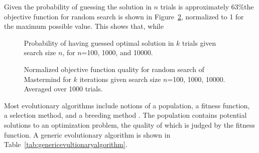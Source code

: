 Given the probability of guessing the solution in $n$ trials is approximately 63\%the objective function for random search is shown in Figure~\ref{fig:randomsearchquality}, normalized to 1 for the maximum possible value.  This shows that, while 

	
	\begin{figure}
		\begin{center}
		\end{center}
	\caption{Probability of having guessed optimal solution in $k$ trials given search size $n$, for $n$=100, 1000, and 10000.}
	\label{fig:randomsearchprobability}
	\end{figure}

	\begin{figure}
		\begin{center}
		\end{center}
	\caption{Normalized objective function quality for random search of Mastermind for $k$ iterations given search size $n$=100, 1000, 10000.  Averaged over 1000 trials.}
	\label{fig:randomsearchquality}
	\end{figure}

Most evolutionary algorithms include notions of a population, a fitness function, a selection method, and a breeding method \cite{re:evolutionaryalgorithms}.  The population contains potential solutions to an optimization problem, the quality of which is judged by the fitness function.  A generic evolutionary algorithm is shown in Table~\ref{tab:genericevultionaryalgorithm}.

